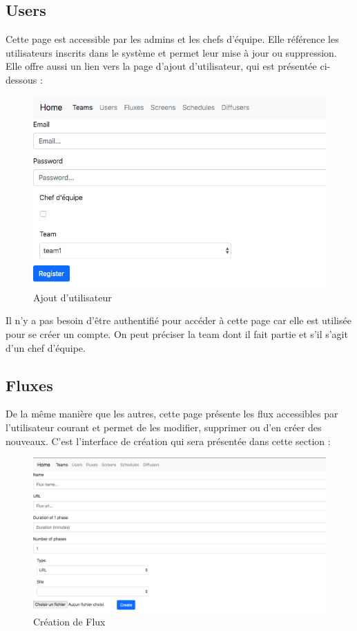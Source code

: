 \documentclass[french]{article}
\begin{document}
\newpage
\subsection{Users}

Cette page est accessible par les admins et les chefs d'équipe. Elle référence les utilisateurs inscrits dans le système et permet leur mise à jour ou suppression. Elle offre aussi un lien vers la page d'ajout d'utilisateur, qui est présentée ci-dessous :

\begin{figure}[h]
	\centering	
	\includegraphics[width=0.8\linewidth]{interface/userpage_register.png}%
	\caption{Ajout d'utilisateur}
\end{figure} 

Il n'y a pas besoin d'être authentifié pour accéder à cette page car elle est utilisée pour se créer un compte. On peut préciser la team dont il fait partie et s'il s'agit d'un chef d'équipe.

\subsection{Fluxes}

De la même manière que les autres, cette page présente les flux accessibles par l'utilisateur courant et permet de les modifier, supprimer ou d'en créer des nouveaux. C'est l'interface de création qui sera présentée dans cette section :

\begin{figure}[h]
	\centering	
	\includegraphics[width=0.8\linewidth]{interface/fluxpage_creation.png}%
	\caption{Création de Flux}
\end{figure} 
\end{document}
